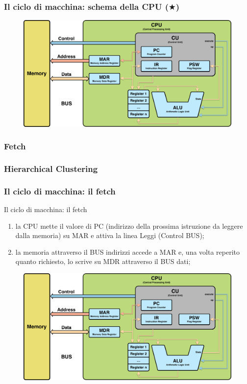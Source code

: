 \begin{frame}
	\frametitle{Il ciclo di macchina: schema della CPU ($\bigstar$)}
	
	\begin{figure}[!htbp] 
		\centering
		\includegraphics[width=1.0\linewidth]{images/4_cpu/architecture_cpu_complex.pdf}
		\label{fig:cpu_complex}
	\end{figure}
	 
\end{frame}



\subsubsection[Fetch]{Fetch}
\begin{frame}
	\frametitle{{\color{GradientDescentDiagramGreen}Hierarchical Clustering}}
	\frametitle{Il ciclo di macchina: il {\color{CpuGreen}\textbf{fetch}}}
	
	\begin{block}{Il ciclo di macchina: il fetch}
		\begin{enumerate}
			\item la CPU mette il valore di PC (indirizzo della prossima istruzione da leggere dalla memoria) su MAR e attiva la linea Leggi (Control BUS);
			\item la memoria attraverso il BUS indirizzi accede a MAR e, una volta reperito quanto richiesto, lo scrive su MDR attraverso il BUS dati;
		\end{enumerate}
	\end{block}
	
	\begin{figure}[!htbp] 
		\centering
		\includegraphics[width=0.7\linewidth]{images/4_cpu/architecture_cpu_complex.pdf}
		\label{fig:cpu_complex}
	\end{figure}
	
\end{frame}


